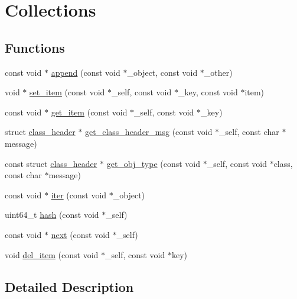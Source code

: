 \hypertarget{group__collection}{}\section{Collections}
\label{group__collection}
\subsection*{Functions}
\begin{DoxyCompactItemize}
\item 
const void $\ast$ \mbox{\hyperlink{group__collection_ga2bd4216bcf1d5810032394f57fbf5c2f}{append}} (const void $\ast$\+\_\+object, const void $\ast$\+\_\+other)
\item 
void $\ast$ \mbox{\hyperlink{group__collection_ga6b0c20cd48a1ab79321a018d29037161}{set\+\_\+item}} (const void $\ast$\+\_\+self, const void $\ast$\+\_\+key, const void $\ast$item)
\item 
const void $\ast$ \mbox{\hyperlink{group__collection_gaa467fc1e6a3036f13ea20b36a6e672a1}{get\+\_\+item}} (const void $\ast$\+\_\+self, const void $\ast$\+\_\+key)
\item 
struct \mbox{\hyperlink{structclass__header}{class\+\_\+header}} $\ast$ \mbox{\hyperlink{group__collection_gacfda61f6ab04bc36786ceb00fab70775}{get\+\_\+class\+\_\+header\+\_\+msg}} (const void $\ast$\+\_\+self, const char $\ast$message)
\item 
const struct \mbox{\hyperlink{structclass__header}{class\+\_\+header}} $\ast$ \mbox{\hyperlink{group__collection_gabf324b663150d7bbcfe0e3b84b21102f}{get\+\_\+obj\+\_\+type}} (const void $\ast$\+\_\+self, const void $\ast$class, const char $\ast$message)
\item 
const void $\ast$ \mbox{\hyperlink{group__collection_ga0cb67414335937707c9b92809a10895b}{iter}} (const void $\ast$\+\_\+object)
\item 
uint64\+\_\+t \mbox{\hyperlink{group__collection_gae0b3682e6ff5038e94c9e551bdd0d489}{hash}} (const void $\ast$\+\_\+self)
\item 
const void $\ast$ \mbox{\hyperlink{group__collection_gaecc46e74b03a83ca8a8023cc7264489c}{next}} (const void $\ast$\+\_\+self)
\item 
void \mbox{\hyperlink{group__collection_ga8b99290b943601321e5bf291daecaae3}{del\+\_\+item}} (const void $\ast$\+\_\+self, const void $\ast$key)
\end{DoxyCompactItemize}


\subsection{Detailed Description}


